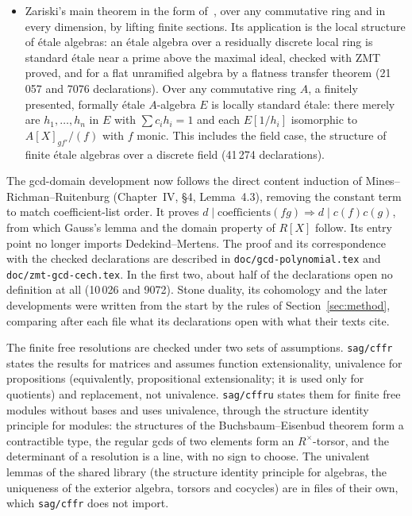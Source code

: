 \documentclass[11pt]{article}
\begin{document}
\begin{itemize}
  and Serre's affineness criterion (16\,141 declarations).
\item Zariski's main theorem in the form of~\cite{ACL}, over any
  commutative ring and in every dimension, by lifting finite sections.
  Its application is the local structure of \'etale algebras: an \'etale
  algebra over a residually discrete local ring is standard \'etale near
  a prime above the maximal ideal, checked with ZMT proved, and for a
  flat unramified algebra by a flatness transfer theorem (21\,057 and
  7076 declarations). Over any commutative ring $A$, a finitely
  presented, formally \'etale $A$-algebra $E$ is locally standard \'etale:
  there merely are $h_1,\dots,h_n$ in $E$ with $\sum c_ih_i=1$ and each
  $E[1/h_i]$ isomorphic to $A[X]_{gf'}/(f)$ with $f$ monic. This includes
  the field case, the structure of finite \'etale algebras over a
  discrete field (41\,274 declarations).
\end{itemize}
The gcd-domain development now follows the direct content induction of
Mines--Richman--Ruitenburg (Chapter~IV, \S4, Lemma~4.3), removing the
constant term to match coefficient-list order. It proves
$d\mid\text{coefficients}(fg)\Rightarrow d\mid c(f)c(g)$, from which
Gauss's lemma and the domain property of $R[X]$ follow. Its entry point
no longer imports Dedekind--Mertens. The proof and its correspondence
with the checked declarations are described in
\texttt{doc/gcd-polynomial.tex} and \texttt{doc/zmt-gcd-cech.tex}.
In the first two, about half of the declarations open no definition at
all (10\,026 and 9072). Stone duality, its cohomology and the later
developments were written from the start by the
rules of Section~\ref{sec:method}, comparing after each file what its
declarations open with what their texts cite.

The finite free resolutions are checked under two sets of assumptions.
\texttt{sag/cffr} states the results for matrices and assumes function
extensionality, univalence for propositions (equivalently, propositional
extensionality; it is used only for quotients) and replacement, not
univalence. \texttt{sag/cffru} states them for finite free modules
without bases and uses univalence, through the structure identity
principle for modules: the structures of the Buchsbaum--Eisenbud
theorem form a contractible type, the regular gcds of two elements form
an $R^\times$-torsor, and the determinant of a resolution is a line,
with no sign to choose. The univalent lemmas of the shared library (the
structure identity principle for algebras, the uniqueness of the
exterior algebra, torsors and cocycles) are in files of their own, which
\texttt{sag/cffr} does not import.
\end{document}
